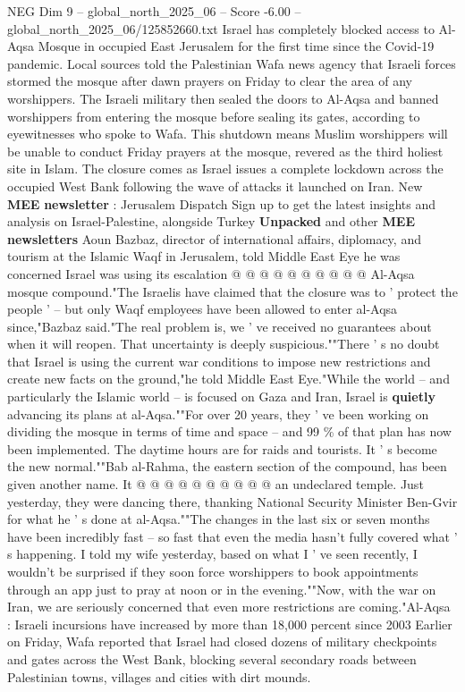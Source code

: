 \begin{textsample}{NEG Dim 9 – global\_north\_2025\_06 – Score -6.00 – global\_north\_2025\_06/125852660.txt}  \label{ex:f9_neg_085}
Israel has completely blocked access to Al-Aqsa Mosque in occupied East Jerusalem for the first time since the Covid-19 pandemic.
Local sources told the Palestinian Wafa news agency that Israeli forces stormed the mosque after dawn prayers on Friday to clear the area of any worshippers.
The Israeli military then sealed the doors to Al-Aqsa and banned worshippers from entering the mosque before sealing its gates, according to eyewitnesses who spoke to Wafa.
This shutdown means Muslim worshippers will be unable to conduct Friday prayers at the mosque, revered as the third holiest site in Islam.
The closure comes as Israel issues a complete lockdown across the occupied West Bank following the wave of attacks it launched on Iran.
New \textbf{MEE} \textbf{newsletter} : Jerusalem Dispatch Sign up to get the latest insights and analysis on Israel-Palestine, alongside Turkey \textbf{Unpacked} and other \textbf{MEE} \textbf{newsletters} Aoun Bazbaz, director of international affairs, diplomacy, and tourism at the Islamic Waqf in Jerusalem, told Middle East Eye he was concerned Israel was using its escalation @ @ @ @ @ @ @ @ @ @ Al-Aqsa mosque compound."The Israelis have claimed that the closure was to ' protect the people ' -- but only Waqf employees have been allowed to enter al-Aqsa since,"Bazbaz said."The real problem is, we ' ve received no guarantees about when it will reopen.
That uncertainty is deeply suspicious.""There ' s no doubt that Israel is using the current war conditions to impose new restrictions and create new facts on the ground,"he told Middle East Eye."While the world -- and particularly the Islamic world -- is focused on Gaza and Iran, Israel is \textbf{quietly} advancing its plans at al-Aqsa.""For over 20 years, they ' ve been working on dividing the mosque in terms of time and space -- and 99 \% of that plan has now been implemented.
The daytime hours are for raids and tourists.
It ' s become the new normal.""Bab al-Rahma, the eastern section of the compound, has been given another name.
It @ @ @ @ @ @ @ @ @ @ an undeclared temple.
Just yesterday, they were dancing there, thanking National Security Minister Ben-Gvir for what he ' s done at al-Aqsa.""The changes in the last six or seven months have been incredibly fast -- so fast that even the media hasn't fully covered what ' s happening.
I told my wife yesterday, based on what I ' ve seen recently, I wouldn't be surprised if they soon force worshippers to book appointments through an app just to pray at noon or in the evening.""Now, with the war on Iran, we are seriously concerned that even more restrictions are coming."Al-Aqsa : Israeli incursions have increased by more than 18,000 percent since 2003 Earlier on Friday, Wafa reported that Israel had closed dozens of military checkpoints and gates across the West Bank, blocking several secondary roads between Palestinian towns, villages and cities with dirt mounds.

\end{textsample}

